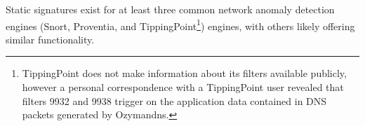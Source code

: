 \documentclass{llncs}
\begin{document}
Static signatures exist for at least three common network anomaly detection
engines (Snort\cite{Chamberland2009.snort_iodine},
Proventia\cite{Proventia2013.ips_tunnel}, and TippingPoint\footnote{TippingPoint
does not make information about its filters available publicly,
however a personal correspondence with a TippingPoint user revealed that filters
9932 and 9938 trigger on the application data contained in DNS packets generated
by Ozymandns.}) engines, with others likely offering similar functionality.
%
%
%
%
%
%
%
\end{document}
